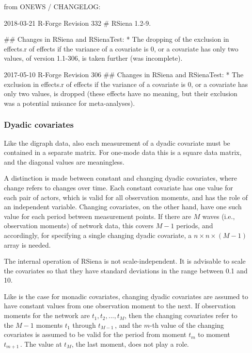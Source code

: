 \documentclass[a4paper,fleqn,11pt]{article}
\newcommand{\+}{\, + \,}
\newcommand{\RS}{{\sf RSiena }}
\begin{document}
from ONEWS / CHANGELOG:

2018-03-21 R-Forge Revision 332
# RSiena 1.2-9.

## Changes in RSiena and RSienaTest:
   * The dropping of the exclusion in effects.r of effects if the variance of a
     covariate is 0, or a covariate has only two values, of version 1.1-306,
     is  taken further (was incomplete).

2017-05-10 R-Forge Revision 306
## Changes in RSiena and RSienaTest:
   * The exclusion in effects.r of effects if the variance of a covariate is 0,
     or a covariate has only two values, is dropped (these effects have no
     meaning, but their exclusion was a potential nuisance for meta-analyses).
\fi



\subsubsection{Dyadic covariates}

Like the digraph data, also each measurement of a dyadic covariate
must be contained in a separate matrix.
For one-mode data this is a square data matrix,
and the diagonal values are meaningless.

A distinction is made between constant and changing dyadic
covariates, where change refers to changes over time. Each constant
covariate has one value for each pair of actors, which is valid for
all observation moments, and has the role of an independent
variable. Changing covariates, on the other hand, have one such
value for each period between measurement points. If there are $M$
waves (i.e., observation moments) of network data,
this covers $M-1$ periods, and accordingly,
for specifying a single changing dyadic covariate,
a $n \times n \times (M-1)$ array is needed.

The internal operation of \RS is not scale-independent.
It is advisable to scale the covariates so that they have
standard deviations in the range between 0.1 and 10.

Like is the case for monadic  covariates,
changing dyadic covariates are assumed to have constant values from one
observation moment to the next. If observation moments for the
network are $t_1, t_2, ..., t_M$, then the changing covariates
refer to the $M-1$ moments $t_1$ through $t_{M-1}\,$, and
the $m$-th value of the changing covariates is assumed to be valid
for the period from moment $t_m$ to moment $t_{m+1}\,$.
The value at $t_M$, the last moment, does not play a role.
\end{document}
